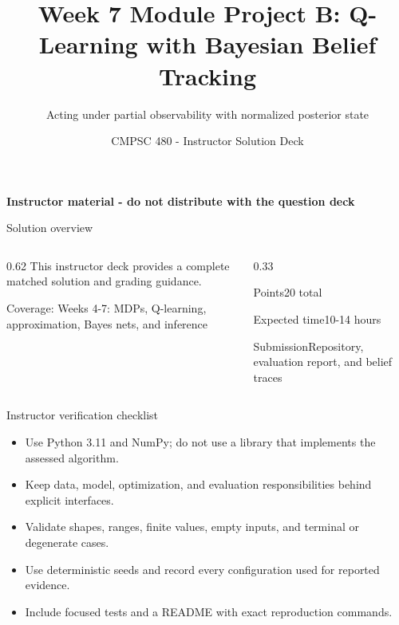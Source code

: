 \documentclass[aspectratio=169,11pt]{beamer}
\title[Module Project B Solutions]{Week 7 Module Project B: Q-Learning with Bayesian Belief Tracking}
\subtitle{Acting under partial observability with normalized posterior state}
\author{CMPSC 480 - Instructor Solution Deck}
\date{}
\begin{document}
\begin{frame}
  \titlepage
\vspace{-0.35cm}
\begin{center}
\color{coursered}\bfseries Instructor material - do not distribute with the question deck
\end{center}
\end{frame}

\begin{frame}{Solution overview}
\begin{columns}[T,onlytextwidth]
\begin{column}{0.62\textwidth}
\Large This instructor deck provides a complete matched solution and grading guidance.

\vspace{0.35cm}
\normalsize
Coverage: Weeks 4-7: MDPs, Q-learning, approximation, Bayes nets, and inference
\end{column}
\begin{column}{0.33\textwidth}
\begin{block}{Points}20 total\end{block}
\begin{block}{Expected time}10-14 hours\end{block}
\begin{block}{Submission}Repository, evaluation report, and belief traces\end{block}
\end{column}
\end{columns}
\end{frame}

\begin{frame}{Instructor verification checklist}
\small
\begin{itemize}
  \item Use Python 3.11 and NumPy; do not use a library that implements the assessed algorithm.
  \item Keep data, model, optimization, and evaluation responsibilities behind explicit interfaces.
  \item Validate shapes, ranges, finite values, empty inputs, and terminal or degenerate cases.
  \item Use deterministic seeds and record every configuration used for reported evidence.
  \item Include focused tests and a README with exact reproduction commands.
\end{itemize}
\end{frame}
\end{document}
